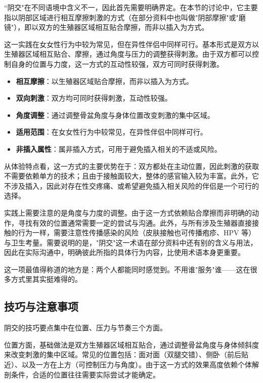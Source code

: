 \documentclass[12pt,UTF8]{ctexbook}
\newcommand{\keyword}[1]{\textbf{#1}}
\begin{document}
“阴交"在不同语境中含义不一，因此首先需要明确界定。在本节的讨论中，它主要指以阴部区域进行相互摩擦刺激的方式（在部分资料中也叫做"阴部摩擦"或"磨镜"），即以双方的生殖器区域相互贴合摩擦，而非以插入为方式。

这一实践在女女性行为中较为常见，但在异性伴侣中同样可行。基本形式是双方以生殖器区域相互贴合、摩擦，通过角度与压力的调整获得刺激。由于双方都可以控制自身的位置与力度，这一方式的互动性较强，双方可同时获得刺激。

\begin{itemize}
	\item \keyword{相互摩擦}：以生殖器区域贴合摩擦，而非以插入为方式。
	\item \keyword{双向刺激}：双方均可同时获得刺激，互动性较强。
	\item \keyword{角度调整}：通过调整骨盆角度与身体位置改变刺激的集中区域。
	\item \keyword{适用范围}：在女女性行为中较常见，在异性伴侣中同样可行。
	\item \keyword{非插入属性}：属非插入方式，可用于避免插入相关的不适或风险。
\end{itemize}

从体验特点看，这一方式的主要优势在于：双方都处在主动位置，因此刺激的获取不需要依赖单方的技术；且由于接触面较大，整体的感官输入较为丰富。此外，它不涉及插入，因此对存在性交疼痛、或希望避免插入相关风险的伴侣是一个可行的选择。

实践上需要注意的是角度与力度的调整。由于这一方式依赖贴合摩擦而非明确的动作，寻找有效的位置通常需要一定的尝试与沟通。此外，与所有涉及生殖器直接接触的行为一样，需要注意性传播感染的风险（皮肤接触也可传播疱疹、HPV 等）与卫生考量。需要说明的是，"阴交"这一术语在部分资料中还有别的含义与用法，因此在实际沟通中，明确彼此所指的具体行为内容，比使用术语本身更重要。

\begin{tcolorbox}[colback=pink!5!white,colframe=red!50!black,title=贴心小叮咛]
	这一项最值得称道的地方是：两个人都能同时感觉到。不用谁"服务"谁——这在很多方式里其实挺难得的。
\end{tcolorbox}
\subsection{技巧与注意事项}

阴交的技巧要点集中在位置、压力与节奏三个方面。

位置方面，基础做法是双方生殖器区域相互贴合，通过调整骨盆角度与身体倾斜度来改变刺激的集中区域。常见的位置包括：面对面（双腿交错）、侧卧（前后贴近）、以及一方在上方（可控制压力与角度）。由于这一方式的效果高度依赖个体解剖条件，合适的位置往往需要实际尝试才能确定。
\end{document}
